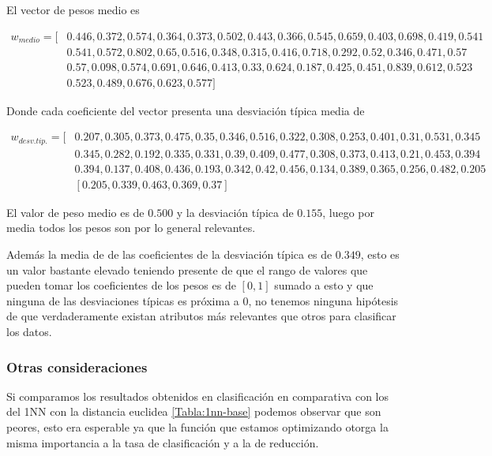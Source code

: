 El vector de pesos medio es 

\begin{align*}
  w_{medio} = [ 
    &  0.446, 0.
    372, 0.574, 0.364, 0.373, 0.502, 0.443, 0.366, 0.545, 0.659, 0.403, 0.698, 0.419, 0.541 \\
    &  0.541, 0.572, 0.802, 0.65, 0.516, 0.348, 0.315, 0.416, 0.718, 0.292, 0.52, 0.346, 0.471, 0.57  \\
    &  0.57, 0.098, 0.574, 0.691, 0.646, 0.413, 0.33, 0.624, 0.187, 0.425, 0.451, 0.839, 0.612, 0.523  \\
    &  0.523, 0.489, 0.676, 0.623, 0.577  
    ]
  \end{align*}
  
  Donde cada coeficiente del vector presenta una desviación típica media de 
  
  \begin{align*}
    w_{desv. tip.} = [ 
      &  0.207, 0.305, 0.373, 0.475, 0.35, 0.346, 0.516, 0.322, 0.308, 0.253, 0.401, 0.31, 0.531, 0.345  \\
      &  0.345, 0.282, 0.192, 0.335, 0.331, 0.39, 0.409, 0.477, 0.308, 0.373, 0.413, 0.21, 0.453, 0.394  \\
      &  0.394, 0.137, 0.408, 0.436, 0.193, 0.342, 0.42, 0.456, 0.134, 0.389, 0.365, 0.256, 0.482, 0.205  \\
      & [0.205, 0.339, 0.463, 0.369, 0.37
     ]
\end{align*}

El valor de peso medio es de $0.500$ y la desviación típica de $0.155$, luego por media todos los pesos son por lo general relevantes. 

Además la media de de las coeficientes de la desviación típica es de $0.349$, esto es un valor bastante elevado teniendo presente de que el rango de valores 
que pueden tomar los coeficientes de los pesos es de $[0,1]$ 
sumado a esto y que ninguna de las desviaciones típicas es
próxima a $0$, no tenemos ninguna hipótesis de que verdaderamente 
existan atributos más relevantes que otros para clasificar los datos.

\subsubsection*{ Otras consideraciones }
Si comparamos los resultados obtenidos en clasificación en comparativa con los del 1NN con la distancia euclidea \ref{Tabla:1nn-base} podemos observar que son peores, esto era esperable ya que la función que estamos optimizando otorga la misma importancia a la tasa de clasificación y a la de reducción.  


